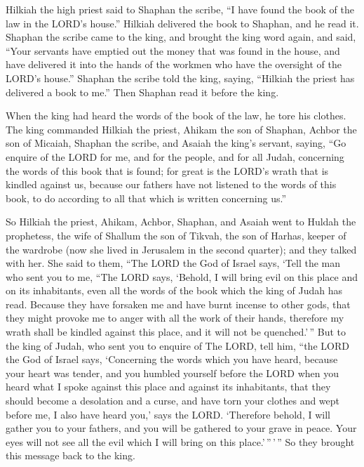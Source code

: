  Hilkiah the high priest said to Shaphan the scribe, ``I
have found the book of the law in the LORD's house.'' Hilkiah delivered
the book to Shaphan, and he read it.  Shaphan the scribe
came to the king, and brought the king word again, and said, ``Your
servants have emptied out the money that was found in the house, and
have delivered it into the hands of the workmen who have the oversight
of the LORD's house.''  Shaphan the scribe told the king,
saying, ``Hilkiah the priest has delivered a book to me.'' Then Shaphan
read it before the king.

 When the king had heard the words of the book of the law,
he tore his clothes.  The king commanded Hilkiah the
priest, Ahikam the son of Shaphan, Achbor the son of Micaiah, Shaphan
the scribe, and Asaiah the king's servant, saying,  ``Go
enquire of the LORD for me, and for the people, and for all Judah,
concerning the words of this book that is found; for great is the LORD's
wrath that is kindled against us, because our fathers have not listened
to the words of this book, to do according to all that which is written
concerning us.''

 So Hilkiah the priest, Ahikam, Achbor, Shaphan, and Asaiah
went to Huldah the prophetess, the wife of Shallum the son of Tikvah,
the son of Harhas, keeper of the wardrobe (now she lived in Jerusalem in
the second quarter); and they talked with her.  She said to
them, ``The LORD the God of Israel says, `Tell the man who sent you to
me,  ``The LORD says, `Behold, I will bring evil on this
place and on its inhabitants, even all the words of the book which the
king of Judah has read.  Because they have forsaken me and
have burnt incense to other gods, that they might provoke me to anger
with all the work of their hands, therefore my wrath shall be kindled
against this place, and it will not be quenched.'\,''  But
to the king of Judah, who sent you to enquire of The LORD, tell him,
``the LORD the God of Israel says, `Concerning the words which you have
heard,  because your heart was tender, and you humbled
yourself before the LORD when you heard what I spoke against this place
and against its inhabitants, that they should become a desolation and a
curse, and have torn your clothes and wept before me, I also have heard
you,' says the LORD.  `Therefore behold, I will gather you
to your fathers, and you will be gathered to your grave in peace. Your
eyes will not see all the evil which I will bring on this
place.'\,''\,'\,'' So they brought this message back to the king.

